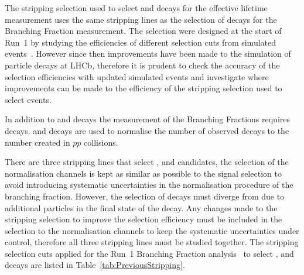 The stripping selection used to select \bsmumu and \bhh decays for the \bsmumu effective lifetime measurement uses the same stripping lines as the selection of \bmumu decays for the Branching Fraction measurement. The selection were designed at the start of Run~1 by studying the efficiencies of different selection cuts from simulated events~\cite{Diego}. However since then improvements have been made to the simulation of particle decays at LHCb, therefore it is prudent to check the accuracy of the selection efficiencies with updated simulated events and investigate where improvements can be made to the efficiency of the stripping selection used to select \bsmumu events.


In addition to \bmumu and \bhh decays the measurement of the \bmumu Branching Fractions requires \bujpsik decays. \bdkpi and \bujpsik decays are used to normalise the number of observed \bsmumu decays to the number created in $pp$ collisions. 

There are three stripping lines that select \bmumu, \bujpsik and \bhh candidates, the selection of the normalisation channels is kept as similar as possible to the signal selection to avoid introducing systematic uncertainties in the normalisation procedure of the branching fraction. However, the selection of \bujpsik decays must diverge from \bsmumu due to additional particles in the final state of the decay. Any changes made to the \bmumu stripping selection to improve the selection efficiency must be included in the selection to the normalisation channels to keep the systematic uncertainties under control, therefore all three stripping lines must be studied together. The stripping selection cuts applied for the Run~1 Branching Fraction analysis~\cite{CMS:2014xfa, Aaij:2013aka} to select \bmumu, \bhh and \bujpsik decays are listed in Table~\ref{tab:PreviousStripping}.


